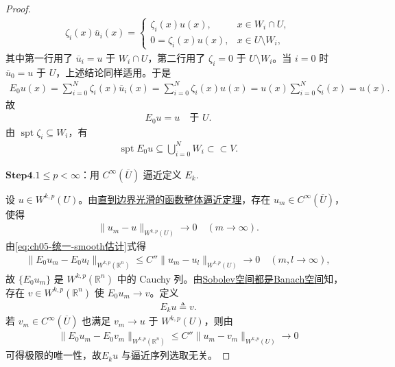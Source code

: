 \documentclass[../../main.tex]{subfiles}
\begin{document}
\begin{proof}
\begin{align*}
\zeta_i(x)\overline{u}_i(x)=
\begin{cases}
\zeta_i(x)u(x), & x\in W_i\cap U,\\
0=\zeta_i(x)u(x), & x\in U\setminus W_i,
\end{cases}
\end{align*}
其中第一行用了 $\overline{u}_i=u$ 于 $W_i\cap U$，第二行用了 $\zeta_i=0$ 于 $U\setminus W_i$。当 $i=0$ 时 $\overline{u}_0=u$ 于 $U$，上述结论同样适用。于是
\begin{align*}
E_0u(x)
=\sum\limits_{i=0}^{N}\zeta_i(x)\overline{u}_i(x)
=\sum\limits_{i=0}^{N}\zeta_i(x)u(x)=u(x)\sum\limits_{i=0}^{N}\zeta_i(x)
=u(x).
\end{align*}
故
\begin{align}
E_0u=u\quad\text{于 }U.
\label{eq:ch05-统一-等于u}
\end{align}
由 $\operatorname{spt}\zeta_i\subseteq W_i$，有
\begin{align}
\operatorname{spt}E_0u\subseteq\bigcup_{i=0}^{N}W_i\subset\subset V.
\label{eq:ch05-统一-支集}
\end{align}

\noindent$\mathbf{Step}\bm{4}$.{\heiti $1\leqslant p<\infty$：用 $C^{\infty}(\overline{U})$ 逼近定义 $E_k$.}

设 $u\in W^{k,p}(U)$。由\hyperref[theorem:ch05-直到边界光滑的函数整体逼近定理]{直到边界光滑的函数整体逼近定理}，存在 $u_m\in C^{\infty}(\overline{U})$，使得
\begin{align*}
\|u_m-u\|_{W^{k,p}(U)}\longrightarrow0\quad(m\to\infty).
\end{align*}
由\eqref{eq:ch05-统一-smooth估计}式得
\begin{align*}
\|E_0u_m-E_0u_l\|_{W^{k,p}(\mathbb{R}^{n})}
\leqslant C''\|u_m-u_l\|_{W^{k,p}(U)}\longrightarrow0\quad(m,l\to\infty),
\end{align*}
故 $\{E_0u_m\}$ 是 $W^{k,p}(\mathbb{R}^{n})$ 中的 Cauchy 列。由\hyperref[theorem:ch05-WkpBanach]{Sobolev空间都是Banach空间}知，存在 $v\in W^{k,p}(\mathbb{R}^{n})$ 使 $E_0u_m\to v$。定义
\begin{align*}
E_ku\triangleq v.
\end{align*}
若 $v_m\in C^{\infty}(\overline{U})$ 也满足 $v_m\to u$ 于 $W^{k,p}(U)$，则由
\begin{align*}
\|E_0u_m-E_0v_m\|_{W^{k,p}(\mathbb{R}^{n})}
\leqslant C''\|u_m-v_m\|_{W^{k,p}(U)}\longrightarrow0
\end{align*}
可得极限的唯一性，故$E_ku$ 与逼近序列选取无关。


\end{proof}
\end{document}
